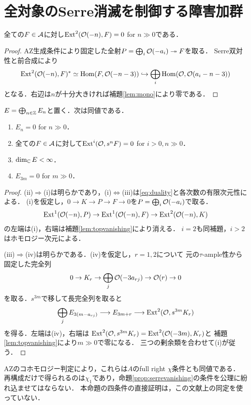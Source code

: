 \documentclass[11pt,a4paper]{ltjsarticle}
\begin{document}
\section{全対象のSerre消滅を制御する障害加群}\label{sec:cohomology}
\begin{lemma}\label{lem:topvanishing}
全ての$F\in\mathcal A$に対し$\operatorname{Ext}^2(\mathcal O(-n),F)=0$ for $n\gg0$である．
\end{lemma}
\begin{proof}
AZ生成条件により固定した全射$P=\bigoplus_i\mathcal O(-a_i)\twoheadrightarrow F$を取る．
Serre双対性と前合成により
\[
 \operatorname{Ext}^2(\mathcal O(-n),F)^*\simeq\operatorname{Hom}(F,\mathcal O(-n-3))
 \hookrightarrow\bigoplus_i\operatorname{Hom}(\mathcal O,\mathcal O(a_i-n-3))
\]
となる．右辺は$n$が十分大きければ補題\ref{lem:mono}により零である．
\end{proof}

\begin{proposition}\label{prop:serrevanishing}
$E=\bigoplus_{n\in\mathbb Z}E_n$と置く．次は同値である．
\begin{enumerate}[label=(\roman*)]
\item $E_n=0$ for $n\gg0$．
\item 全ての$F\in\mathcal A$に対して$\operatorname{Ext}^i(\mathcal O,s^nF)=0$ for $i>0,n\gg0$．
\item $\dim_\mathbb C E<\infty$．
\item $E_{3m}=0$ for $m\gg0$．
\end{enumerate}
\end{proposition}
\begin{proof}
(ii)$\Rightarrow$(i)は明らかであり，(i)$\Leftrightarrow$(iii)は\eqref{eq:duality}と各次数の有限次元性による．
(i)を仮定し，$0\to K\to P\to F\to0$を$P=\bigoplus_i\mathcal O(-a_i)$で取る．
\[
 \operatorname{Ext}^1(\mathcal O(-n),P)\to\operatorname{Ext}^1(\mathcal O(-n),F)
 \to\operatorname{Ext}^2(\mathcal O(-n),K)
\]
の左端は(i)，右端は補題\ref{lem:topvanishing}により消える．
$i=2$も同補題，$i>2$はホモロジー次元による．

(iii)$\Rightarrow$(iv)は明らかである．(iv)を仮定し，$r=1,2$について
元の$\tau$-ample性から固定した完全列
\[
 0\to K_r\to\bigoplus_j\mathcal O(-3a_{rj})\to\mathcal O(r)\to0
\]
を取る．$s^{3m}$で移して長完全列を取ると
\[
 \bigoplus_jE_{3(m-a_{rj})}\longrightarrow E_{3m+r}
 \longrightarrow\operatorname{Ext}^2(\mathcal O,s^{3m}K_r)
\]
を得る．左端は(iv)，右端は
$\operatorname{Ext}^2(\mathcal O,s^{3m}K_r)=\operatorname{Ext}^2(\mathcal O(-3m),K_r)$と
補題\ref{lem:topvanishing}により$m\gg0$で零になる．
三つの剰余類を合わせて(i)が従う．
\end{proof}

AZのコホモロジー判定\cite[Corollary 7.5]{AZ}により，これらは$A$のfull right $\chi$条件とも同値である．
再構成だけで得られるのは$\chi_1$であり，命題\ref{prop:serrevanishing}の条件を公理に紛れ込ませてはならない．
本命題の四条件の直接証明は，この文献上の同定を使っていない．
\end{document}
